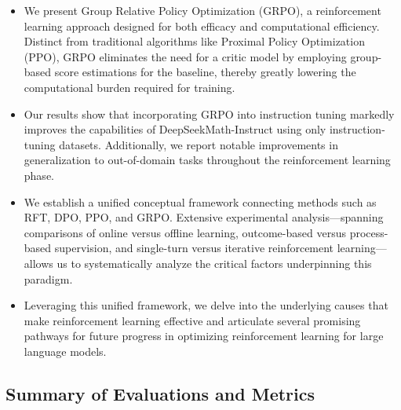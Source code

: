 \begin{itemize}[topsep=0pt]
    \item We present Group Relative Policy Optimization (GRPO), a reinforcement learning approach designed for both efficacy and computational efficiency. Distinct from traditional algorithms like Proximal Policy Optimization (PPO), GRPO eliminates the need for a critic model by employing group-based score estimations for the baseline, thereby greatly lowering the computational burden required for training.
    \item Our results show that incorporating GRPO into instruction tuning markedly improves the capabilities of DeepSeekMath-Instruct using only instruction-tuning datasets. Additionally, we report notable improvements in generalization to out-of-domain tasks throughout the reinforcement learning phase.
    \item We establish a unified conceptual framework connecting methods such as RFT, DPO, PPO, and GRPO. Extensive experimental analysis—spanning comparisons of online versus offline learning, outcome-based versus process-based supervision, and single-turn versus iterative reinforcement learning—allows us to systematically analyze the critical factors underpinning this paradigm.
    \item Leveraging this unified framework, we delve into the underlying causes that make reinforcement learning effective and articulate several promising pathways for future progress in optimizing reinforcement learning for large language models.
\end{itemize}

\subsection{Summary of Evaluations and Metrics}

